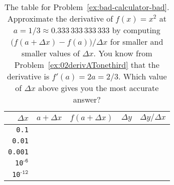 \begin{table}[h]
  \centering
  \begin{tabular}{r|p{75pt}|p{75pt}|p{75pt}|p{75pt}}
    \hline\rule[-6pt]{0pt}{18pt}
    $\Delta x$ & $a+\Delta x$ & $f(a+\Delta x)$ & $\Delta y$ & $\Delta y / \Delta x$ \\
    \hline\rule[-6pt]{0pt}{18pt}
    \texttt{0.1} &&&&\\
    \hline\rule[-6pt]{0pt}{18pt}
    \texttt{0.01} &&&&\\
    \hline\rule[-6pt]{0pt}{18pt}
    \texttt{0.001} &&&&\\
    \hline\rule[-6pt]{0pt}{18pt}
    \texttt{10}$^{\texttt{-6}}$ &&&&\\
    \hline\rule[-6pt]{0pt}{18pt}
    \texttt{10}$^{\texttt{-12}}$ &&&&\\
    \hline
  \end{tabular}
  \medskip
  
  \caption{The table for Problem~\ref{ex:bad-calculator-bad}.
  Approximate the derivative of $f(x) = x^2$ at
  $a=1/3 \approx 0.333\,333\,333\,333$ by computing $\bigl(f(a+\Delta
  x) - f(a)\bigr)/\Delta x$ for smaller and smaller values of $\Delta
  x$.  You know from Problem~\ref{ex:02derivATonethird} that
  the derivative is $f'(a) = 2a = 2/3$.  Which value of
  $\Delta x$ above gives you the most accurate answer?}
\end{table}


